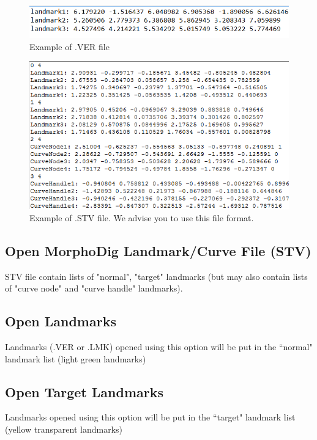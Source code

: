 \begin{figure}
  \centering
  \includegraphics[scale=0.5]{images/07/landmarks/VER_file.png}
 \caption{Example of .VER file}
\label{VER_file}
\end{figure}
\begin{figure}
  \centering
  \includegraphics[scale=0.5]{images/07/landmarks/STV_file.png}
 \caption{Example of .STV file. We advise you to use this file format.}
\label{STV_file}
\end{figure}

\subsection{Open MorphoDig Landmark/Curve File (STV)}
STV file contain lists of "normal", "target" landmarks (but may also contain lists of "curve node" and "curve handle" landmarks).
\subsection{Open Landmarks}
Landmarks (.VER or .LMK) opened using this option will be put in the ``normal" landmark list (light green landmarks)
\subsection{Open Target Landmarks}
Landmarks opened using this option will be put in the ``target" landmark list (yellow transparent landmarks)
